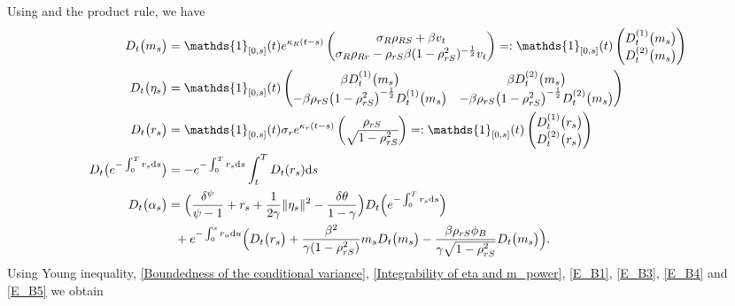 \documentclass[12,reqno]{amsart}
\numberwithin{equation}{section}
\begin{document}
Using \cite[Sect.~3.2.2.1 on p.64]{alos2008malliavin} and the product rule, we have
\begin{align}
	D_{t}\big(m_{s}\big)&=\mathds{1}_{[0,s]}(t)e^{\kappa_{R}(t-s)} \begin{pmatrix}
		\sigma_{R}\rho_{RS}+\beta v_{t}\\ \sigma_{R}\rho_{Rr}-\rho_{rS}\beta(1-\rho_{rS}^{2})^{-\frac{1}{2}}v_{t}
	\end{pmatrix}=:\mathds{1}_{[0,s]}(t)\begin{pmatrix}
		D_{t}^{(1)}\big(m_{s}\big)\\ D_{t}^{(2)}\big(m_{s}\big)
	\end{pmatrix}\label{E_B1}\\
	D_{t}\big(\eta_{s}\big)
	&=\mathds{1}_{[0,s]}(t)\begin{pmatrix}
		\beta D_{t}^{(1)}\big(m_{s}\big) & \beta D_{t}^{(2)}\big(m_{s}\big)\\ -\beta\rho_{rS}\big(1-\rho_{rS}^{2}\big)^{-\frac{1}{2}}D_{t}^{(1)}\big(m_{s}\big) & -\beta\rho_{rS}\big(1-\rho_{rS}^{2}\big)^{-\frac{1}{2}}D_{t}^{(2)}\big(m_{s}\big)
	\end{pmatrix}\label{E_B2}\\
	D_{t}\big(r_{s}\big)&=\mathds{1}_{[0,s]}(t)\sigma_{r}e^{\kappa_{r}(t-s)}\begin{pmatrix}
		\rho_{rS}\\ \sqrt{1-\rho_{rS}^{2}}
	\end{pmatrix}=:\mathds{1}_{[0,s]}(t)\begin{pmatrix}
		D_{t}^{(1)}\big(r_{s}\big)\\ D_{t}^{(2)}\big(r_{s}\big)
	\end{pmatrix}\label{E_B3}\\
	D_{t}\big(e^{-\int_{0}^{T}r_{s}\mathrm{d}s}\big)&=-e^{-\int_{0}^{T}r_{s}\mathrm{d}s}\int_{t}^{T}D_{t}(r_{s})\mathrm{d}s\label{E_B4}\\
	D_{t}\big(\alpha_{s}\big)
	&=\Big(\frac{\delta^{\psi}}{\psi-1}+r_{s}+\frac{1}{2\gamma}\|\eta_{s}\|^{2}-\frac{\delta\theta}{1-\gamma}\Big)D_{t}\Big(e^{-\int_{0}^{T}r_{s}\mathrm{d}s}\Big)\notag\\
	&\phantom{x}+e^{-\int_{0}^{s}r_{u}\mathrm{d}u}\Big(D_{t}\big(r_{s}\big)+\frac{\beta^{2}}{\gamma(1-\rho_{rS}^{2})}m_{s}D_{t}\big(m_{s}\big)-\frac{\beta\rho_{rS}\phi_{B}}{\gamma\sqrt{1-\rho_{rS}^{2}}}D_{t}\big(m_{s}\big)\Big).\label{E_B5}
\end{align}
Using Young inequality, \eqref{Boundedness of the conditional variance}, \eqref{Integrability of eta and m_power}, \eqref{E_B1}, \eqref{E_B3}, \eqref{E_B4} and \eqref{E_B5} we obtain
\end{document}
